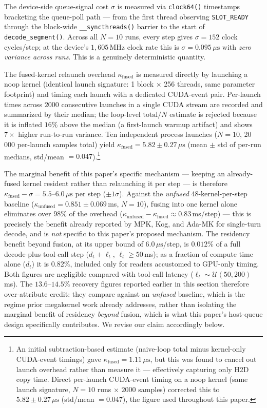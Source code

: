 \documentclass{article}
\begin{document}
The device-side queue-signal cost $\sigma$ is measured via
\texttt{clock64()} timestamps bracketing the queue-poll path ---
from the first thread observing \texttt{SLOT\_READY} through the
block-wide \texttt{\_\_syncthreads()} barrier to the start of
\texttt{decode\_segment()}. Across all $N=10$ runs, every step gives
$\sigma = 152$ clock cycles/step; at the device's $1{,}605$\,MHz
clock rate this is $\sigma = 0.095\,\mu\text{s}$ with
\emph{zero variance across runs}. This is a genuinely deterministic
quantity.

The fused-kernel relaunch overhead
$\kappa_{\text{fused}}$ is measured directly by launching a noop
kernel (identical launch signature: 1 block $\times$ 256 threads,
same parameter footprint) and timing each launch with a dedicated
CUDA-event pair. Per-launch times across $2000$ consecutive launches
in a single CUDA stream are recorded and summarized by their median;
the loop-level $\text{total}/N$ estimate is rejected because it is
inflated $16\%$ above the median (a first-launch warmup artifact)
and shows $7\times$ higher run-to-run variance. Ten independent
process launches ($N=10$, 20\,000 per-launch samples total) yield
$\kappa_{\text{fused}} = 5.82 \pm 0.27\,\mu\text{s}$ (mean $\pm$ std
of per-run medians, std/mean $= 0.047$).\footnote{An initial
subtraction-based estimate (naive-loop total minus kernel-only
CUDA-event timings) gave $\kappa_{\text{fused}} = 1.11\,\mu\text{s}$,
but this was found to cancel out launch overhead rather than measure
it --- effectively capturing only H2D copy time. Direct per-launch
CUDA-event timing on a noop kernel (same launch signature, $N=10$
runs $\times$ $2000$ samples) corrected this to
$5.82 \pm 0.27\,\mu\text{s}$ (std/mean $= 0.047$), the figure used
throughout this paper.}

The marginal benefit of this paper's specific mechanism --- keeping an
already-fused kernel resident rather than relaunching it per step ---
is therefore $\kappa_{\text{fused}} - \sigma = 5.5$--$6.0\,\mu\text{s}$
per step ($\pm 1\sigma$). Against the \emph{unfused} 48-kernel-per-step baseline
($\kappa_{\text{unfused}} = 0.851\pm0.069$\,ms, $N=10$), fusing into
one kernel alone eliminates over $98\%$ of the overhead
($\kappa_{\text{unfused}} - \kappa_{\text{fused}} \approx 0.83$\,ms/step)
--- this is precisely the benefit already reported by MPK, Kog, and
Ada-MK \citep{mpk2025,kog2026,adamk2026} for single-turn decode, and
is \emph{not} specific to this paper's proposed mechanism. The
residency benefit beyond fusion, at its upper bound of
$6.0\,\mu\text{s}$/step, is $0.012\%$ of a full decode-plus-tool-call
step ($d_t + \ell_t$, $\ell_t \geq 50$\,ms); as a fraction of compute
time alone ($d_t$) it is $0.82\%$, included only for readers accustomed to
GPU-only timing. Both figures are negligible compared with tool-call
latency ($\ell_t \sim \mathcal{U}(50,200)$\,ms). The $13.6$--$14.5\%$ recovery
figures reported earlier in this section therefore over-attribute
credit: they compare against an \emph{unfused} baseline, which is the
regime prior megakernel work already addresses, rather than isolating
the marginal benefit of residency \emph{beyond} fusion, which is what
this paper's host-queue design specifically contributes. We revise our
claim accordingly below.
\end{document}
